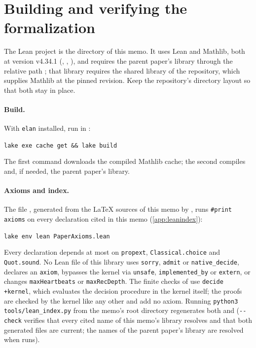 \section{Building and verifying the formalization}\label{app:verification}

The Lean project is the directory  of this memo. It uses Lean and Mathlib, both at version v4.34.1
(, , ), and requires the parent paper's
library  through the relative path ; that library requires the shared
 library of the repository, which supplies Mathlib at the pinned revision. Keep the
repository's directory layout so that both stay in place.

\paragraph{Build.} With \texttt{elan} installed, run in :
\begin{center}
\texttt{lake exe cache get \&\& lake build}
\end{center}
The first command downloads the compiled Mathlib cache; the second compiles  and, if needed,
the parent paper's library.

\paragraph{Axioms and index.} The file , generated from the \LaTeX{} sources of this memo
by , runs \texttt{\#print axioms} on every declaration cited in this memo
(\cref{app:leanindex}):
\begin{center}
\texttt{lake env lean PaperAxioms.lean}
\end{center}
Every declaration depends at most on \texttt{propext}, \texttt{Classical.choice} and \texttt{Quot.sound}. No Lean file
of this library uses \texttt{sorry}, \texttt{admit} or \texttt{native\_decide}, declares an \texttt{axiom}, bypasses the
kernel via \texttt{unsafe}, \texttt{implemented\_by} or \texttt{extern}, or changes \texttt{maxHeartbeats} or
\texttt{maxRecDepth}. The finite checks of  use \texttt{decide +kernel}, which evaluates the
decision procedure in the kernel itself; the proofs are checked by the kernel like any other and add no axiom. Running \texttt{python3 tools/lean\_index.py} from the memo's root directory regenerates both
 and  (\texttt{-{}-check} verifies that every cited
name of this memo's library resolves and that both generated files are current; the names of the parent paper's
library are resolved when  runs).

